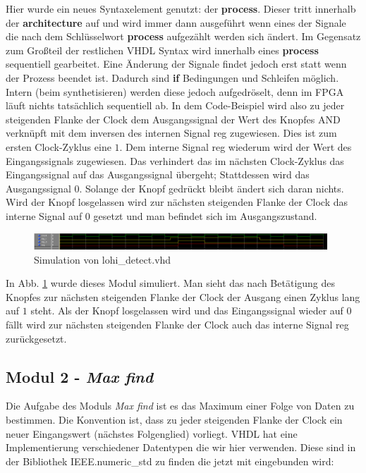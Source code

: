 

Hier wurde ein neues Syntaxelement genutzt: der \textbf{process}.
Dieser tritt innerhalb der \textbf{architecture} auf und wird immer dann ausgeführt wenn eines der Signale die nach dem Schlüsselwort \textbf{process} aufgezählt werden sich ändert.
Im Gegensatz zum Großteil der restlichen VHDL Syntax wird innerhalb eines \textbf{process} sequentiell gearbeitet.
Eine Änderung der Signale findet jedoch erst statt wenn der Prozess beendet ist.
Dadurch sind \textbf{if} Bedingungen und Schleifen möglich.
Intern (beim synthetisieren) werden diese jedoch aufgedröselt, denn im FPGA läuft nichts tatsächlich sequentiell ab.
In dem Code-Beispiel wird also zu jeder steigenden Flanke der Clock dem Ausgangssignal der Wert des Knopfes AND verknüpft mit dem inversen des internen Signal reg zugewiesen.
Dies ist zum ersten Clock-Zyklus eine $1$.
Dem interne Signal reg wiederum wird der Wert des Eingangssignals zugewiesen.
Das verhindert das im nächsten Clock-Zyklus das Eingangssignal auf das Ausgangssignal übergeht; Stattdessen wird das Ausgangssignal $0$.
Solange der Knopf gedrückt bleibt ändert sich daran nichts.
Wird der Knopf losgelassen wird zur nächsten steigenden Flanke der Clock das interne Signal auf $0$ gesetzt und man befindet sich im Ausgangszustand.

\begin{figure}[ht]
	\centering
    \includegraphics[width=0.98\textwidth]{../Daten/lohi_detect.png}
	\caption{Simulation von lohi\_detect.vhd}
	\label{img_lohi_detect}
\end{figure}

In Abb. \ref{img_lohi_detect} wurde dieses Modul simuliert.
Man sieht das nach Betätigung des Knopfes zur nächsten steigenden Flanke der Clock der Ausgang einen Zyklus lang auf $1$ steht.
Als der Knopf losgelassen wird und das Eingangssignal wieder auf $0$ fällt wird zur nächsten steigenden Flanke der Clock auch das interne Signal reg zurückgesetzt.

\subsection{Modul 2 - \textit{Max find}}

Die Aufgabe des Moduls \textit{Max find} ist es das Maximum einer Folge von Daten zu bestimmen.
Die Konvention ist, dass zu jeder steigenden Flanke der Clock ein neuer Eingangswert (nächstes Folgenglied) vorliegt.
VHDL hat eine Implementierung verschiedener Datentypen die wir hier verwenden.
Diese sind in der Bibliothek IEEE.numeric\_std zu finden die jetzt mit eingebunden wird:

